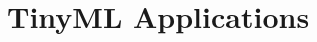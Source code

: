 \documentclass[../main]{subfiles}
\begin{document}
\chapter{TinyML Applications} \label{chp:}










\end{document}
